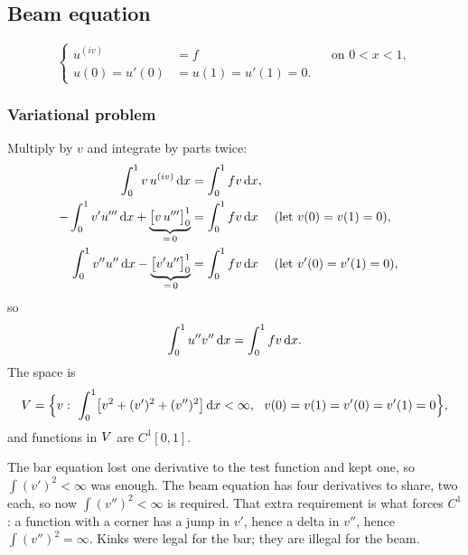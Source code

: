 \subsection*{Beam equation}

\begin{equation}\label{eq:l11beam}
  \left\{
  \begin{aligned}
    u^{(iv)}&=f &&\text{on }0<x<1,\\
    u(0)=u'(0)&=u(1)=u'(1)=0 .
  \end{aligned}\right.
\end{equation}

\subsubsection*{Variational problem}

Multiply by $v$ and integrate by parts twice:
\begin{align}
  \int_0^1 v\,u^{(iv)}\,\mathrm{d} x&=\int_0^1 f v\,\mathrm{d} x ,\label{eq:l11ibp0}\\
  -\int_0^1 v'u'''\,\mathrm{d} x+\underbrace{\bigl[v\,u'''\bigr]_0^1}_{=\,0}
     &=\int_0^1 f v\,\mathrm{d} x
     &&\text{(let } v(0)=v(1)=0),\label{eq:l11ibp1}\\
  \int_0^1 v''u''\,\mathrm{d} x-\underbrace{\bigl[v'u''\bigr]_0^1}_{=\,0}
     &=\int_0^1 f v\,\mathrm{d} x
     &&\text{(let } v'(0)=v'(1)=0),\label{eq:l11ibp2}
\end{align}
so
\begin{equation}\label{eq:l11weak}
  \int_0^1 u''v''\,\mathrm{d} x=\int_0^1 f v\,\mathrm{d} x .
\end{equation}
The space is
\begin{equation}\label{eq:l11V}
  \Vsp=\Bigl\{v:\ \int_0^1\bigl[v^{2}+(v')^{2}+(v'')^{2}\bigr]\dx<\infty,\ \
  v(0)=v(1)=v'(0)=v'(1)=0\Bigr\},
\end{equation}
and functions in $V$ are $C^{1}[0,1]$.

\medskip
\noindent{}

\begin{intuition}
The bar equation lost one derivative to the test function and kept one, so
$\int(v')^{2}<\infty$ was enough. The beam equation has four derivatives to
share, two each, so now $\int(v'')^{2}<\infty$ is required. That extra
requirement is what forces $C^{1}$: a function with a corner has a jump in $v'$,
hence a delta in $v''$, hence $\int(v'')^{2}=\infty$. Kinks were legal for the
bar; they are illegal for the beam.
\end{intuition}

